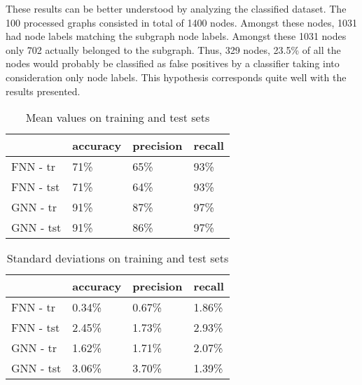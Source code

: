 These results can be better understood by analyzing the classified dataset. The 100 processed graphs consisted in total of 1400 nodes. Amongst these nodes, 1031 had node labels matching the subgraph node labels. Amongst these 1031 nodes only 702 actually belonged to the subgraph. Thus, 329 nodes, 23.5\% of all the nodes would probably be classified as false positives by a classifier taking into consideration only node labels. This hypothesis corresponds quite well with the results presented.

\begin{table}[h!]
	\begin{center}
	\begin{tabular}{llll}
	\toprule
	& accuracy & precision & recall \\
	\midrule
	FNN - tr &	71\% &  65\% & 93\% \\
	FNN - tst &	71\% &  64\% &  93\% \\
	GNN - tr &	91\% &  87\%&  97\% \\
	GNN - tst &	91\% &  86\% &  97\% \\
	\bottomrule
	\end{tabular}
	\caption{Mean values on training and test sets}
	\label{tab:crossmean}
	\end{center}
\end{table}

\begin{table}[h!]
	\begin{center}
	\begin{tabular}{llll}
	\toprule
	& accuracy & precision & recall \\
	\midrule
	FNN - tr &	0.34\% &  0.67\% & 1.86\% \\
	FNN - tst &	2.45\% &  1.73\% &  2.93\% \\
	GNN - tr &	1.62\% &  1.71\% &  2.07\% \\
	GNN - tst &	3.06\% &  3.70\% &  1.39\% \\
	\bottomrule
	\end{tabular}
	\caption{Standard deviations on training and test sets}
	\label{tab:crossstd}
	\end{center}
\end{table}
